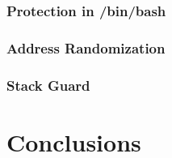 \documentclass[12pt, a4paper, pdflatex]{article}
\begin{document}
\subsubsection{Protection in /bin/bash}

\lipsum[2]


\subsubsection{Address Randomization}

\lipsum[2]


\subsubsection{Stack Guard}

\lipsum[2]


\section{Conclusions}

\newpage


\end{document}
